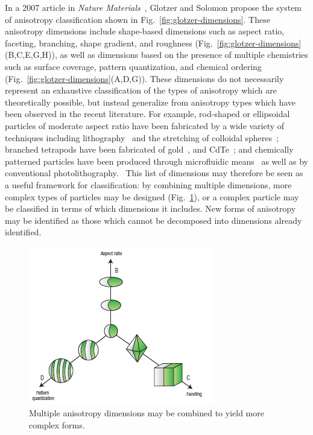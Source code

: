 In a 2007 article in \textit{Nature Materials}~\cite{glotzer-solomon}, Glotzer and Solomon propose the system of anisotropy 
classification shown in Fig.~\ref{fig:glotzer-dimensions}. These 
anisotropy dimensions include shape-based dimensions such as aspect 
ratio, faceting, branching, shape gradient, 
and roughness (Fig.~\ref{fig:glotzer-dimensions}(B,C,E,G,H)), as well as dimensions based on the presence of
multiple chemistries such as surface coverage, pattern quantization, and chemical ordering 
(Fig.~\ref{fig:glotzer-dimensions}(A,D,G)).  These dimensions do not necessarily 
represent an exhaustive classification of the types
of anisotropy which are theoretically possible, but 
instead generalize from anisotropy types which have been observed in the
recent literature.  For example, rod-shaped or ellipsoidal particles of moderate aspect ratio have been fabricated 
by a wide variety of techniques including 
lithography~\cite{desimone-shear} and the stretching of colloidal spheres~\cite{rods-mohraz}; branched 
tetrapods have been fabricated of gold~\cite{gold-tetrapods},
and CdTe~\cite{cdte-tetrapods}; and chemically patterned particles have been produced
through microfluidic means~\cite{shepherd-janus}
as well as by conventional photolithography.~\cite{desimone-janus}  This list of dimensions may therefore
be seen as a useful framework for classification: by combining multiple dimensions, more complex types of particles may be 
designed (Fig.~\ref{fig:dimensions-combined}), or a complex particle may be classified in terms of which dimensions it includes.
New forms of anisotropy may be identified as those which cannot be decomposed into dimensions already identified.

\begin{figure}[h]
\begin{center}
\includegraphics{figures/glotzer-combine-dimensions.png}
\end{center}
\caption{Multiple anisotropy dimensions may be combined to yield more complex forms.~\cite{glotzer-solomon}}
\label{fig:dimensions-combined}
\end{figure}

